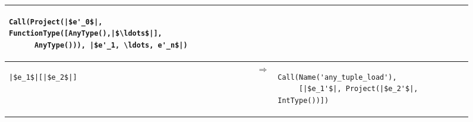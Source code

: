 \documentclass[7x10]{TimesAPriori_MIT}%
\numberwithin{theorem}{chapter}
\numberwithin{definition}{chapter}
\numberwithin{equation}{chapter}
\begin{document}
\begin{figure}[btp]
\begin{tcolorbox}[colback=white]
{\begin{tabular}{|lll|}
\begin{minipage}{0.7\textwidth}
\begin{lstlisting}
Call(Project(|$e'_0$|, FunctionType([AnyType(),|$\ldots$|],
      AnyType())), |$e'_1, \ldots, e'_n$|)
\end{lstlisting}
\end{minipage}
\\[2ex]\hline
\begin{minipage}{0.23\textwidth}
\begin{lstlisting}
|$e_1$|[|$e_2$|]
\end{lstlisting}
\end{minipage}
&
$\Rightarrow$
&
\begin{minipage}{0.7\textwidth}
\begin{lstlisting}
Call(Name('any_tuple_load'),
     [|$e_1'$|, Project(|$e_2'$|, IntType())])
\end{lstlisting}
\end{minipage}
\\\hline
\end{tabular} 
\fi}
  \end{tcolorbox}


\end{figure}
\end{document}
